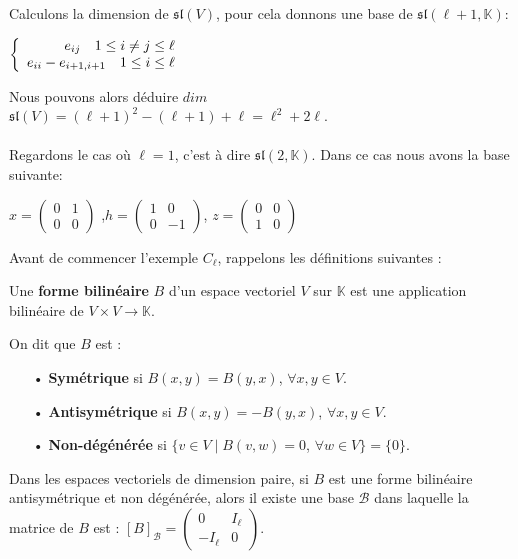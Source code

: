 \documentclass[a4paper,openany,12pt]{report}
\newcommand{\KK}{\mathbb{K}}
\newcommand{\ssl}{\mathfrak{sl}}
\theoremstyle{break}
{\theorembodyfont{\upshape}
\newtheorem*{rmq}{Remarque :}
\newtheorem*{prv}{Preuve :}
\newtheorem*{ex}{Exemples :}
\newtheorem*{exe}{Exemple : }
\newtheorem*{nota}{Notation :}
\newtheorem*{dem}{D\'emonstration :}}
\begin{document}
Calculons la dimension de $\ssl(V)$, pour cela donnons une base de $\ssl(\ell+1,\KK)$:
\begin{center}
$\left \{
   \begin{array}{r c l}
e_{ij }\quad 1\leq i \neq j \leq \ell \\
e_{ii}-e_{i+1,i+1} \quad 1\leq i \leq \ell
   \end{array}
   \right .$
\end{center}

Nous pouvons alors déduire $dim$ $\ssl(V) = (\ell + 1)^2 - (\ell + 1) + \ell = \ell^2+2\ell$.\\
\\
Regardons le cas où $\ell=1$, c'est à dire $\ssl(2,\KK)$. Dans ce cas nous avons la base suivante:
\begin{center}
$ x=\begin{pmatrix} 0 & 1 \\ 0 & 0 \end{pmatrix} $ ,\quad $ h=\begin{pmatrix} 1 & 0 \\ 0 & -1 \end{pmatrix} $, \quad $ z=\begin{pmatrix} 0 & 0 \\ 1 & 0 \end{pmatrix} $
\end{center}
\bigskip

Avant de commencer l'exemple $ C_{\ell} $, rappelons les définitions suivantes :

\begin{df} 
\quad Une \textbf{forme bilinéaire} $B$ d'un espace vectoriel $V$ sur $\KK$ est une application bilinéaire de $V\times V\to  \KK$.

On dit que $B$ est : 
\begin{itemize}
\item[•] \textbf{Symétrique} si $B(x,y)=B(y,x)$, $\forall x,y \in V$. 

\item[•] \textbf{Antisymétrique} si $B(x,y)=-B(y,x)$,  $\forall x,y \in V$. 

\item[•] \textbf{Non-dégénérée} si $\{ v \in V \mid B(v,w)=0$, $\forall w \in V \}= \{ 0 \}$.
\end{itemize}
\end{df}

\begin{rmq} 
\quad Dans les espaces vectoriels de dimension paire, si $B$ est une forme bilinéaire antisymétrique et non dégénérée, alors il existe une base $\mathcal{B}$ dans laquelle la matrice de $B$ est : $[ B ]_\mathcal{B}=\begin{pmatrix} 0 & I_\ell \\ -I_\ell & 0 \end{pmatrix} $.
\end{rmq}
\end{document}
